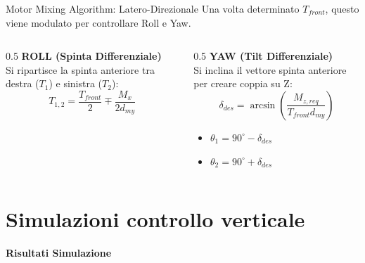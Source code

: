 \documentclass[aspectratio=169]{beamer} %
\begin{document}
\begin{frame}{Motor Mixing Algorithm: Latero-Direzionale}
    Una volta determinato $T_{front}$, questo viene modulato per controllare Roll e Yaw.
    
    \vspace{0.5cm}
    \begin{columns}[T]
        \begin{column}{0.5\textwidth}
            \textbf{ROLL (Spinta Differenziale)} \\
            Si ripartisce la spinta anteriore tra destra ($T_1$) e sinistra ($T_2$):
            \begin{equation*}
                T_{1,2} = \frac{T_{front}}{2} \mp \frac{M_x}{2 d_{my}}
            \end{equation*}
        \end{column}
        \begin{column}{0.5\textwidth}
            \textbf{YAW (Tilt Differenziale)} \\
            Si inclina il vettore spinta anteriore per creare coppia su Z:
            \begin{equation*}
                \delta_{des} = \arcsin\left( \frac{M_{z,req}}{T_{front} d_{my}} \right)
            \end{equation*}
            \begin{itemize}
                \item $\theta_1 = 90^\circ - \delta_{des}$
                \item $\theta_2 = 90^\circ + \delta_{des}$
            \end{itemize}
        \end{column}
    \end{columns}
\end{frame}

\section{Simulazioni controllo verticale}

\begin{frame}
    \vfill
    \centering
    {\Huge \textbf{Risultati Simulazione}}
    \vfill
\end{frame}
\end{document}
